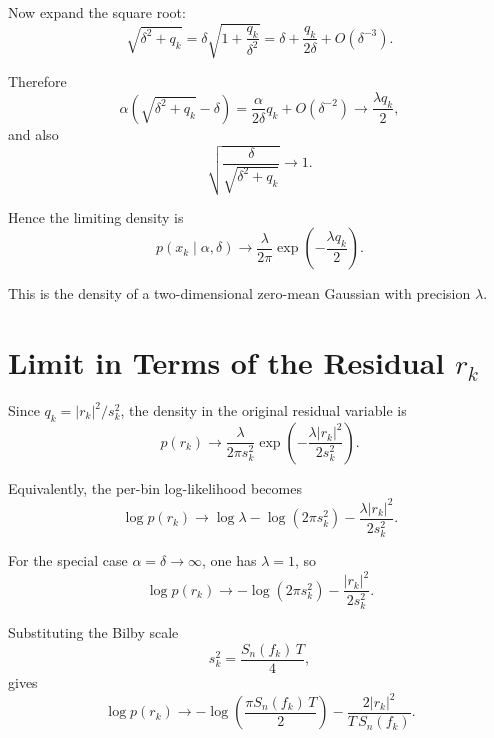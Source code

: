 \documentclass[11pt]{article}
\begin{document}
Now expand the square root:
\begin{equation}
  \sqrt{\delta^2 + q_k}
  =
  \delta \sqrt{1 + \frac{q_k}{\delta^2}}
  =
  \delta + \frac{q_k}{2\delta} + O(\delta^{-3}).
\end{equation}

Therefore
\begin{equation}
  \alpha \left(\sqrt{\delta^2 + q_k} - \delta\right)
  =
  \frac{\alpha}{2\delta} q_k + O(\delta^{-2})
  \to
  \frac{\lambda q_k}{2},
\end{equation}
and also
\begin{equation}
  \sqrt{\frac{\delta}{\sqrt{\delta^2 + q_k}}} \to 1.
\end{equation}

Hence the limiting density is
\begin{equation}
  p(x_k \mid \alpha, \delta)
  \to
  \frac{\lambda}{2\pi}
  \exp\!\left(-\frac{\lambda q_k}{2}\right).
\end{equation}

This is the density of a two-dimensional zero-mean Gaussian with precision $\lambda$.

\section*{Limit in Terms of the Residual $r_k$}

Since $q_k = |r_k|^2 / s_k^2$, the density in the original residual variable is
\begin{equation}
  p(r_k)
  \to
  \frac{\lambda}{2\pi s_k^2}
  \exp\!\left(-\frac{\lambda |r_k|^2}{2 s_k^2}\right).
\end{equation}

Equivalently, the per-bin log-likelihood becomes
\begin{equation}
  \log p(r_k)
  \to
  \log \lambda - \log(2\pi s_k^2) - \frac{\lambda |r_k|^2}{2 s_k^2}.
\end{equation}

For the special case $\alpha = \delta \to \infty$, one has $\lambda = 1$, so
\begin{equation}
  \log p(r_k)
  \to
  -\log(2\pi s_k^2) - \frac{|r_k|^2}{2 s_k^2}.
\end{equation}

Substituting the Bilby scale
\begin{equation}
  s_k^2 = \frac{S_n(f_k)\,T}{4},
\end{equation}
gives
\begin{equation}
  \log p(r_k)
  \to
  -\log\!\left(\frac{\pi S_n(f_k)\,T}{2}\right)
  - \frac{2|r_k|^2}{T\,S_n(f_k)}.
\end{equation}
\end{document}
